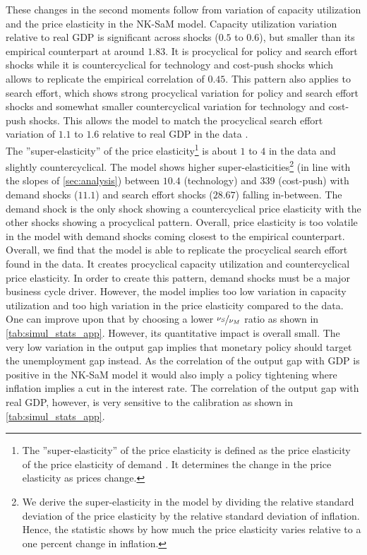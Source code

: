 \documentclass[12pt,3p,authoryear,review]{elsarticle}
\begin{document}
These changes in the second moments follow from variation of capacity utilization and the price elasticity in the NK-SaM model. Capacity utilization variation relative to real GDP is significant across shocks ($0.5$ to $0.6$), but smaller than its empirical counterpart at around $1.83$. It is procyclical for policy and search effort shocks while it is countercyclical for technology and cost-push shocks which allows to replicate the empirical correlation of $0.45$. This pattern also applies to search effort, which shows strong procyclical variation for policy and search effort shocks and somewhat smaller countercyclical variation for technology and cost-push shocks. This allows the model to match the procyclical search effort variation of $1.1$ to $1.6$ relative to real GDP in the data \citep{petrosky-nadeauShoppingTime2016}.\\%
The ''super-elasticity'' of the price elasticity\footnote{The ''super-elasticity'' of the price elasticity is defined as the price elasticity of the price elasticity of demand \citep{klenow2016real}. It determines the change in the price elasticity as prices change.} is about $1$ to $4$ in the data \citep{beck2020price,dossche2010kinked} and slightly countercyclical. The model shows higher super-elasticities\footnote{We derive the super-elasticity in the model by dividing the relative standard deviation of the price elasticity by the relative standard deviation of inflation. Hence, the statistic shows by how much the price elasticity varies relative to a one percent change in inflation.} (in line with the slopes of \cref{sec:analysis}) between $10.4$ (technology) and $339$ (cost-push) with demand shocks ($11.1$) and search effort shocks ($28.67$) falling in-between. The demand shock is the only shock showing a countercyclical price elasticity with the other shocks showing a procyclical pattern. Overall, price elasticity is too volatile in the model with demand shocks coming closest to the empirical counterpart.\\%
Overall, we find that the model is able to replicate the procyclical search effort found in the data. It creates procyclical capacity utilization and countercyclical price elasticity. In order to create this pattern, demand shocks must be a major business cycle driver. However, the model implies too low variation in capacity utilization and too high variation in the price elasticity compared to the data. One can improve upon that by choosing a lower $\nicefrac{\nu_S}{\nu_M}$ ratio as shown in \cref{tab:simul_stats_app}. However, its quantitative impact is overall small. The very low variation in the output gap implies that monetary policy should target the unemployment gap instead. As the correlation of the output gap with GDP is positive in the NK-SaM model it would also imply a policy tightening where inflation implies a cut in the interest rate. The correlation of the output gap with real GDP, however, is very sensitive to the calibration as shown in \cref{tab:simul_stats_app}.%
\end{document}
